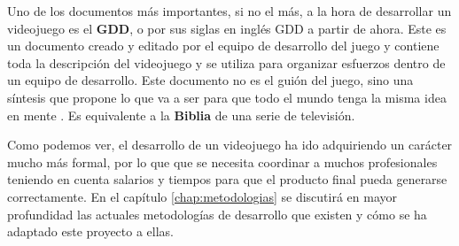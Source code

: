 Uno de los documentos más importantes, si no el más, a la hora de desarrollar un videojuego es el \textbf{\acl{GDD}}, o por sus siglas en inglés \acs{GDD} a partir de ahora. Este es un documento creado y editado por el equipo de desarrollo  del juego y contiene toda la descripción del videojuego y se utiliza para organizar esfuerzos dentro de un equipo de desarrollo. Este documento no es el guión del juego, sino una síntesis que propone lo que va a ser para que todo el mundo tenga la misma idea en mente \cite{bet-03}. Es equivalente a la \textbf{Biblia} de una serie de televisión. 

Como podemos ver, el desarrollo de un videojuego ha ido adquiriendo un carácter mucho más formal, por lo que que se necesita coordinar a muchos profesionales teniendo en cuenta salarios y tiempos para que el producto final pueda generarse correctamente. En el capítulo \ref{chap:metodologias} se discutirá en mayor profundidad las actuales metodologías de desarrollo que existen y cómo se ha adaptado este proyecto a ellas.

